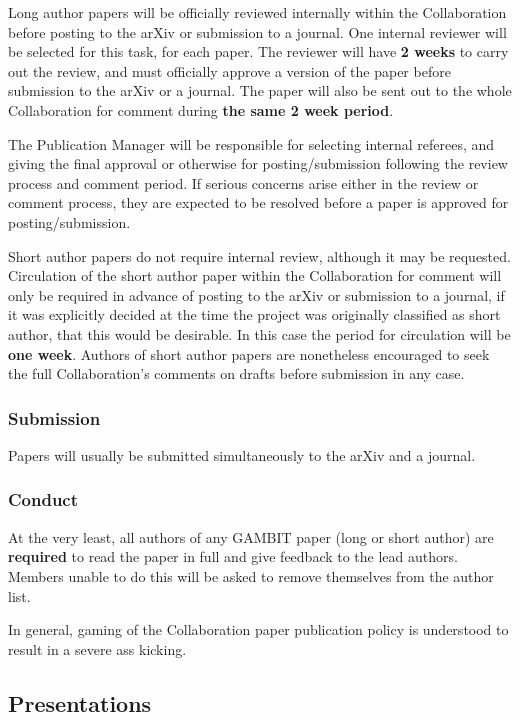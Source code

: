 Long author papers will be officially reviewed internally within the Collaboration before posting to the arXiv or submission to a journal.  One internal reviewer will be selected for this task, for each paper.  The reviewer will have \textbf{2 weeks} to carry out the review, and must officially approve a version of the paper before submission to the arXiv or a journal.  The paper will also be sent out to the whole Collaboration for comment during \textbf{the same 2 week period}.

The Publication Manager will be responsible for selecting internal referees, and giving the final approval or otherwise for posting/submission following the review process and comment period.  If serious concerns arise either in the review or comment process, they are expected to be resolved before a paper is approved for posting/submission.

Short author papers do not require internal review, although it may be requested.  Circulation of the short author paper within the Collaboration for comment will only be required in advance of posting to the arXiv or submission to a journal, if it was explicitly decided at the time the project was originally classified as short author, that this would be desirable.  In this case the period for circulation will be \textbf{one week}.  Authors of short author papers are nonetheless encouraged to seek the full Collaboration's comments on drafts before submission in any case.

\subsubsection{Submission}

Papers will usually be submitted simultaneously to the arXiv and a journal.

\subsubsection{Conduct}

At the very least, all authors of any GAMBIT paper (long or short author) are \textbf{required} to read the paper in full and give feedback to the lead authors.  Members unable to do this will be asked to remove themselves from the author list.

In general, gaming of the Collaboration paper publication policy is understood to result in a severe ass kicking.

\subsection{Presentations}

